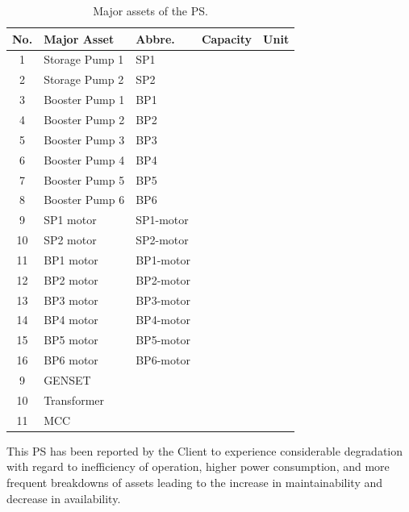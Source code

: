 \begin{table}[h]
\caption{Major assets of the PS.}
\label{assetlist01}
{\footnotesize
\begin{tabular}{|l|l|l|l|l|}
	\hline
	\multicolumn{1}{|c|}{No.} & Major Asset & Abbre. & Capacity & Unit  \\ 
	\hline
	\multicolumn{1}{|c|}{1} & Storage Pump 1 & SP1 &  &   \\ 
	\hline
	\multicolumn{1}{|c|}{2} & Storage Pump 2 & SP2 &  &   \\ 
	\hline
	\multicolumn{1}{|c|}{3} & Booster Pump 1 & BP1 &  &   \\ 
	\hline
	\multicolumn{1}{|c|}{4} & Booster Pump 2 & BP2 &  &   \\ 
	\hline
	\multicolumn{1}{|c|}{5} & Booster Pump 3 & BP3 &  &   \\ 
	\hline
	\multicolumn{1}{|c|}{6} & Booster Pump 4 & BP4 &  &   \\ 
	\hline
	\multicolumn{1}{|c|}{7} & Booster Pump 5 & BP5 &  &    \\ 
	\hline
	\multicolumn{1}{|c|}{8} & Booster Pump 6 & BP6 &  &    \\ 
	\hline
		\multicolumn{1}{|c|}{9} & SP1 motor & SP1-motor &  &    \\ 
	\hline
			\multicolumn{1}{|c|}{10} & SP2 motor & SP2-motor &  &    \\ 
	\hline
			\multicolumn{1}{|c|}{11} & BP1 motor & BP1-motor &  &    \\ 
	\hline
			\multicolumn{1}{|c|}{12} & BP2 motor & BP2-motor &  &    \\ 
	\hline
			\multicolumn{1}{|c|}{13} & BP3 motor & BP3-motor &  &    \\ 
\hline
			\multicolumn{1}{|c|}{14} & BP4 motor & BP4-motor &  &    \\ 
\hline
			\multicolumn{1}{|c|}{15} & BP5 motor & BP5-motor &  &    \\ 
\hline
			\multicolumn{1}{|c|}{16} & BP6 motor & BP6-motor &  &    \\ 
\hline
	\multicolumn{1}{|c|}{9} & GENSET &  &  &   \\ 
	\hline
	\multicolumn{1}{|c|}{10} & Transformer &  &  &   \\ 
	\hline
	\multicolumn{1}{|c|}{11} & MCC &  &  &    \\ 
	\hline
\end{tabular}
		}
\end{table}

This PS has been reported by the Client to experience considerable degradation with regard to inefficiency of operation, higher power consumption, and more frequent breakdowns of assets leading to the increase in maintainability and decrease in availability. 

